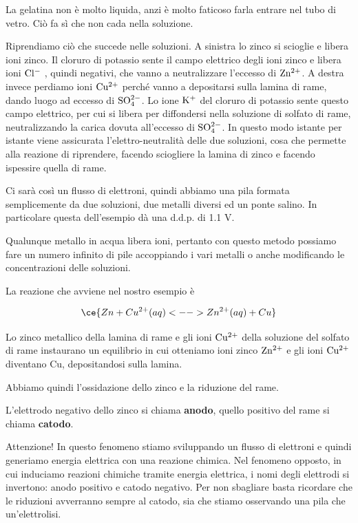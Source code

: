 La gelatina non è molto liquida, anzi è molto faticoso farla entrare nel tubo di vetro. Ciò fa sì che non cada nella soluzione.

Riprendiamo ciò che succede nelle soluzioni. A sinistra lo zinco si scioglie e libera ioni zinco. Il cloruro di potassio sente il campo elettrico degli ioni zinco e libera ioni $\rm Cl^-$ , quindi negativi, che vanno a neutralizzare l'eccesso di $\rm Zn^{2+}$. A destra invece perdiamo ioni $\rm Cu^{2+}$ perché vanno a depositarsi sulla lamina di rame, dando luogo ad eccesso di $\rm SO_4^{2-}$. Lo ione $\rm K^+$ del cloruro di potassio sente questo campo elettrico, per cui si libera per diffondersi nella soluzione di solfato di rame, neutralizzando la carica dovuta all'eccesso di $\rm SO_4^{2-}$. In questo modo istante per istante viene assicurata l'elettro-neutralità delle due soluzioni, cosa che permette alla reazione di riprendere, facendo sciogliere la lamina di zinco e facendo ispessire quella di rame.

Ci sarà così un flusso di elettroni, quindi abbiamo una pila formata semplicemente da due soluzioni, due metalli diversi ed un ponte salino. In particolare questa dell'esempio dà una d.d.p. di 1.1 V.

Qualunque metallo in acqua libera ioni, pertanto con questo metodo possiamo fare un numero infinito di pile accoppiando i vari metalli o anche modificando le concentrazioni delle soluzioni.

La reazione che avviene nel nostro esempio è

$$\ce{Zn + Cu^{2+}(aq) <--> Zn^{2+}(aq) + Cu}$$

Lo zinco metallico della lamina di rame e gli ioni $\rm Cu^{2+}$ della soluzione del solfato di rame instaurano un equilibrio in cui otteniamo ioni zinco $\rm Zn^{2+}$ e gli ioni $\rm Cu^{2+}$ diventano Cu, depositandosi sulla lamina.

Abbiamo quindi l'ossidazione dello zinco e la riduzione del rame.

L'elettrodo negativo dello zinco si chiama \textbf{anodo}, quello positivo del rame si chiama \textbf{catodo}.

Attenzione! In questo fenomeno stiamo sviluppando un flusso di elettroni e quindi generiamo energia elettrica con una reazione chimica. Nel fenomeno opposto, in cui induciamo reazioni chimiche tramite energia elettrica, i nomi degli elettrodi si invertono: anodo positivo e catodo negativo. Per non sbagliare basta ricordare che le riduzioni avverranno sempre al catodo, sia che stiamo osservando una pila che un'elettrolisi.

